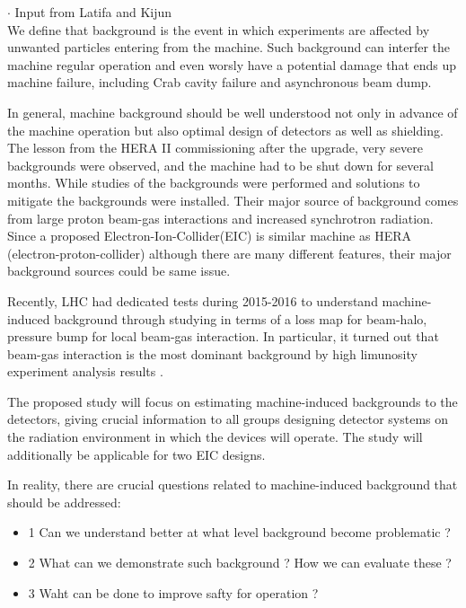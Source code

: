 
$\cdot$ Input from Latifa and Kijun\\

We define that background is the event in which experiments are affected by unwanted particles entering from the machine.
Such background can interfer the machine regular operation and even worsly have a potential damage that ends up machine
failure, including Crab cavity failure and asynchronous beam dump.


In general, machine background should be well understood not only in advance of the machine operation but also optimal
design of detectors as well as shielding. The lesson from the HERA II commissioning after the upgrade, very severe
backgrounds were observed, and the machine had to be shut down for several months. While studies of the backgrounds
were performed and solutions to mitigate the backgrounds were installed. Their major source of background comes from
large proton beam-gas interactions and increased synchrotron radiation. Since a proposed Electron-Ion-Collider(EIC)
is similar machine as HERA (electron-proton-collider) although there are many different features, their major background
sources could be same issue.


Recently, LHC had dedicated tests during 2015-2016 to understand machine-induced background through studying in terms of
a loss map for beam-halo, pressure bump for local beam-gas interaction. In particular, it turned out that beam-gas interaction
is the most dominant background by high limunosity experiment analysis results \cite{Bruce:2016}.


The proposed study will focus on estimating machine-induced backgrounds to the detectors, giving crucial information
to all groups designing detector systems on the radiation environment in which the devices will operate. The study
will additionally be applicable for two EIC designs.



In reality, there are crucial questions related to machine-induced background that should be addressed:
\begin{itemize}
\item{1} Can we understand better at what level background become problematic ?
\item{2} What can we demonstrate such background ? How we can evaluate these ?
\item{3} Waht can be done to improve safty for operation ?
\end{itemize}



